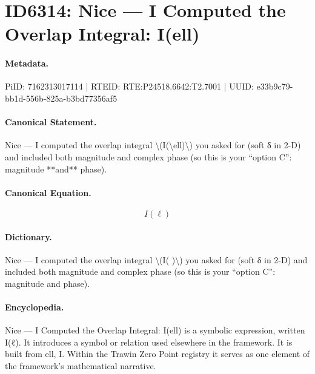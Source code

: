 \section*{ID6314: Nice — I Computed the Overlap Integral: I(ell)}
\paragraph{Metadata.}
PiID: 7162313017114 | RTEID: RTE:P24518.6642:T2.7001 | UUID: e33b9c79-bb1d-556b-825a-b3bd77356af5

\paragraph{Canonical Statement.}
Nice — I computed the overlap integral \textbackslash{}(I(\textbackslash{}ell)\textbackslash{}) you asked for (soft δ in 2-D) and included both magnitude and complex phase (so this is your “option C”: magnitude **and** phase).

\paragraph{Canonical Equation.}
\[
I(\ell)
\]

\paragraph{Dictionary.}
Nice — I computed the overlap integral \textbackslash{}(I( )\textbackslash{}) you asked for (soft δ in 2-D) and included both magnitude and complex phase (so this is your “option C”: magnitude and phase).

\paragraph{Encyclopedia.}
Nice — I Computed the Overlap Integral: I(ell) is a symbolic expression, written I(ℓ). It introduces a symbol or relation used elsewhere in the framework. It is built from ell, I. Within the Trawin Zero Point registry it serves as one element of the framework's mathematical narrative.
